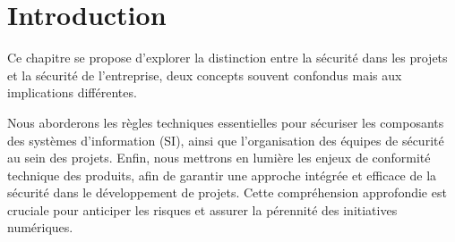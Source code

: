 
\section{Introduction}


Ce chapitre se propose d'explorer la distinction entre la sécurité dans les projets et la sécurité de l'entreprise, deux concepts souvent confondus mais aux implications différentes. 

Nous aborderons les règles techniques essentielles pour sécuriser les composants des systèmes d'information (SI), ainsi que l'organisation des équipes de sécurité au sein des projets. Enfin, nous mettrons en lumière les enjeux de conformité technique des produits, afin de garantir une approche intégrée et efficace de la sécurité dans le développement de projets. Cette compréhension approfondie est cruciale pour anticiper les risques et assurer la pérennité des initiatives numériques.

